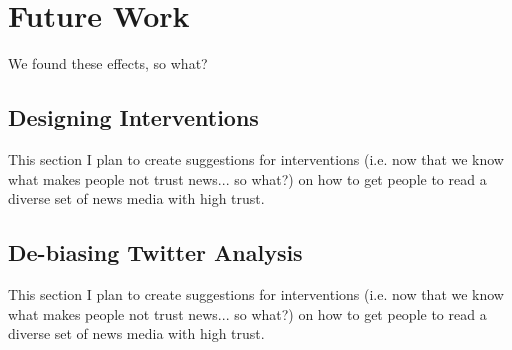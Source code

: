 \chapter{Future Work}
We found these effects, so what?
 
\section{Designing Interventions}
This section I plan to create suggestions for interventions (i.e. now that we know what makes people not trust news... so what?) on how to get people to read a diverse set of news media with high trust.


\section{De-biasing Twitter Analysis}
This section I plan to create suggestions for interventions (i.e. now that we know what makes people not trust news... so what?) on how to get people to read a diverse set of news media with high trust.